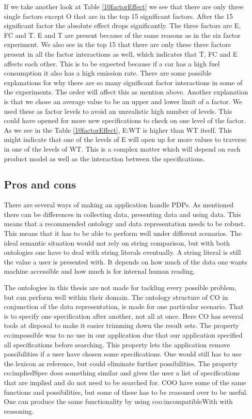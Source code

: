 \documentclass{llncs}
\begin{document}
If we take another look at Table \ref{10factorEffect} we see that
there are only three single factors except O that are in the top 15
significant factors.  After the 15 significant factor the absolute
effect drops significantly. The three factors are E, FC and T. E and T
are present because of the same reasons as in the six factor
experiment. We also see in the top 15 that there are only these three
factors present in all the factor interactions as well, which
indicates that T, FC and E affects each other. This is to be expected
because if a car has a high fuel consumption it also has a high
emission rate. There are some possible explanations for why there are
so many significant factor interactions in some of the
experiments. The order will affect this as mention above. Another
explanation is that we chose an average value to be an upper and lower
limit of a factor. We used these as factor levels to avoid an
unrealistic high number of levels. This could have opened for more new
specifications to check on one level of the factor.  As we see in the
Table \ref{10factorEffect}, \textsf{E:WT} is higher than \textsf{WT}
itself. This might indicate that one of the levels of E will open up
for more values to traverse in one of the levels of WT. This is a
complex matter which will depend on each product model as well as the
interaction between the specifications.

\subsection{Pros and cons}
There are several ways of making an application handle PDPs. As
mentioned there can be differences in collecting data, presenting data
and using data. This means that a recommended ontology and data
representation needs to be robust. This means that it has to be able
to perform well under different scenarios.  The ideal semantic
situation would not rely on string comparison, but with both
ontologies one have to deal with string literals eventually. A string
literal is still the value a user is presented with.  It depends on
how much of the data one wants machine accessible and how much is for
internal human reading.

The ontologies in this thesis are not made for tackling every possible
problem, but can perform well within their domain. The ontology
structure of CO in conjunction of the data representation, is made for
one particular scenario. That is to specify one specification after
another, not all at once. Here CO has several tools at disposal to
make it easier trimming down the result sets. The property
\textsf{co:impossible} was to no use in our application due that our
application specified all specifications before searching. This
property lets the application remove possibilities if a user have
chosen some specifications. One would still has to use the lexicon as
reference, but could eliminate further possibilities. The property
\textsf{co:impliedSpec} does something similar and gives the user a
list of specifications that are implied and do not need to be searched
for.  COO have some of the same functions and possibilities, but some
of these has to be reasoned over to be useful. One can produce the
same functionality by using \textsf{coo:incompatibleWith} with
reasoning.
\end{document}
